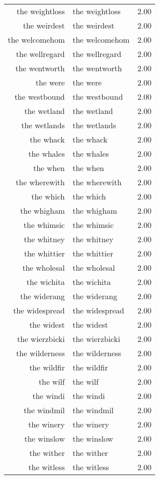 \begin{table}[ht]
\begin{tabular}{rlr}
  the weightloss & the weightloss & 2.00 \\ 
  the weirdest & the weirdest & 2.00 \\ 
  the welcomehom & the welcomehom & 2.00 \\ 
  the wellregard & the wellregard & 2.00 \\ 
  the wentworth & the wentworth & 2.00 \\ 
  the were & the were & 2.00 \\ 
  the westbound & the westbound & 2.00 \\ 
  the wetland & the wetland & 2.00 \\ 
  the wetlands & the wetlands & 2.00 \\ 
  the whack & the whack & 2.00 \\ 
  the whales & the whales & 2.00 \\ 
  the when & the when & 2.00 \\ 
  the wherewith & the wherewith & 2.00 \\ 
  the which & the which & 2.00 \\ 
  the whigham & the whigham & 2.00 \\ 
  the whimsic & the whimsic & 2.00 \\ 
  the whitney & the whitney & 2.00 \\ 
  the whittier & the whittier & 2.00 \\ 
  the wholesal & the wholesal & 2.00 \\ 
  the wichita & the wichita & 2.00 \\ 
  the widerang & the widerang & 2.00 \\ 
  the widespread & the widespread & 2.00 \\ 
  the widest & the widest & 2.00 \\ 
  the wierzbicki & the wierzbicki & 2.00 \\ 
  the wilderness & the wilderness & 2.00 \\ 
  the wildfir & the wildfir & 2.00 \\ 
  the wilf & the wilf & 2.00 \\ 
  the windi & the windi & 2.00 \\ 
  the windmil & the windmil & 2.00 \\ 
  the winery & the winery & 2.00 \\ 
  the winslow & the winslow & 2.00 \\ 
  the wither & the wither & 2.00 \\ 
  the witless & the witless & 2.00 \\ 

\end{tabular}
\end{table}
